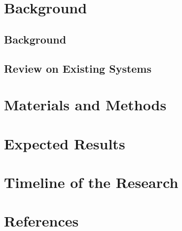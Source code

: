 \documentclass{article}
\begin{document}
\section{Background}
\subsection{Background}

\subsection{Review on Existing Systems}


\section{Materials and Methods}


\section{Expected Results}


\section{Timeline of the Research}

\section{References}
\end{document}
